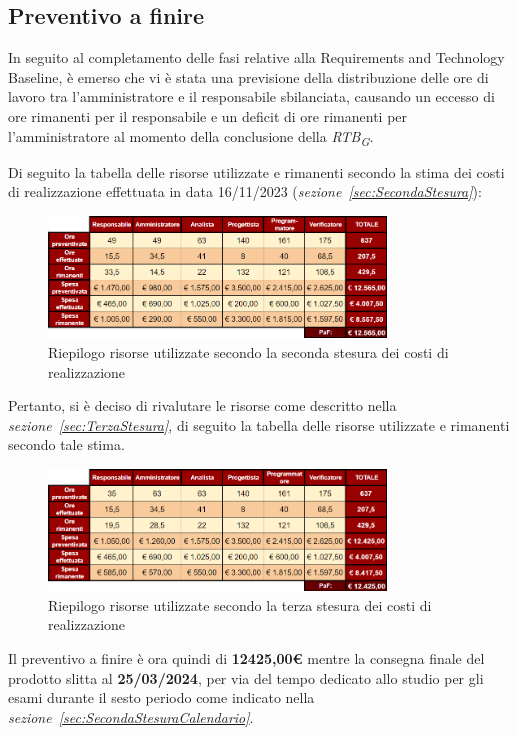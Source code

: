 \subsection{Preventivo a finire}
In seguito al completamento delle fasi relative alla Requirements and Technology Baseline, è emerso che vi è stata una previsione della distribuzione delle ore di lavoro tra l'amministratore e il responsabile sbilanciata, causando un eccesso di ore rimanenti per il responsabile e un deficit di ore rimanenti per l'amministratore al momento della conclusione della \textit{RTB}\textsubscript{\textit{G}}.

Di seguito la tabella delle risorse utilizzate e rimanenti secondo la stima dei costi di realizzazione effettuata in data 16/11/2023 (\textit{sezione~\ref{sec:SecondaStesura}}):
\begin{figure}[H]
    \centering
    \includegraphics[width=0.8\textwidth]{../Images/PaF1stesura.PNG}
    \caption{Riepilogo risorse utilizzate secondo la seconda stesura dei costi di realizzazione}
    \label{fig:RisorseRimanentiRTB}
\end{figure}

Pertanto, si è deciso di rivalutare le risorse come descritto nella \textit{sezione~\ref{sec:TerzaStesura}},
di seguito la tabella delle risorse utilizzate e rimanenti secondo tale stima.

\begin{figure}[H]
    \centering
    \includegraphics[width=0.8\textwidth]{../Images/PaF2stesura.PNG}
    \caption{Riepilogo risorse utilizzate secondo la terza stesura dei costi di realizzazione}
    \label{fig:RisorseRimanentiRTB2}
\end{figure}    
Il preventivo a finire è ora quindi di \textbf{12425,00€} mentre la consegna finale del prodotto slitta al \textbf{25/03/2024}, per via del tempo dedicato allo studio per gli esami durante il sesto periodo come indicato nella \textit{sezione~\ref{sec:SecondaStesuraCalendario}}.

